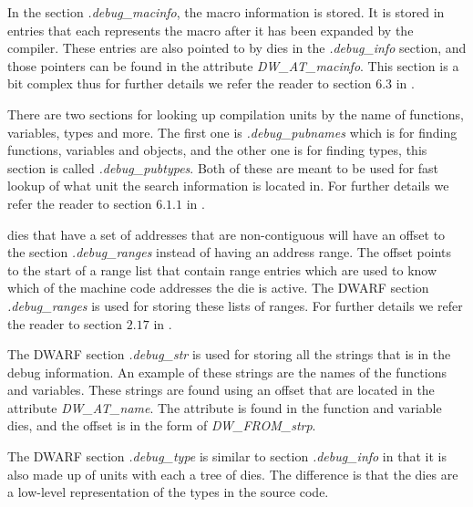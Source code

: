 In the section \emph{.debug\_macinfo}, the macro information is stored.
It is stored in entries that each represents the macro after it has been expanded by the compiler.
These entries are also pointed to by \glspl{die} in the \emph{.debug\_info} section, and those pointers can be found in the attribute \emph{DW\_AT\_macinfo}.
This section is a bit complex thus for further details we refer the reader to section $6.3$ in \cite{dwarf}.


There are two sections for looking up compilation units by the name of functions, variables, types and more.
The first one is \emph{.debug\_pubnames} which is for finding functions, variables and objects, and the other one is for finding types, this section is called \emph{.debug\_pubtypes}.
Both of these are meant to be used for fast lookup of what unit the search information is located in.
For further details we refer the reader to section $6.1.1$ in \cite{dwarf}.


\Glspl{die} that have a set of addresses that are non-contiguous will have an offset to the section \emph{.debug\_ranges} instead of having an address range.
The offset points to the start of a range list that contain range entries which are used to know which of the machine code addresses the \gls{die} is active.
The \gls{DWARF} section \emph{.debug\_ranges} is used for storing these lists of ranges.
For further details we refer the reader to section $2.17$ in \cite{dwarf}.


The \gls{DWARF} section \emph{.debug\_str} is used for storing all the strings that is in the debug information.
An example of these strings are the names of the functions and variables.
These strings are found using an offset that are located in the attribute \emph{DW\_AT\_name}.
The attribute is found in the function and variable \glspl{die}, and the offset is in the form of \emph{DW\_FROM\_strp}.


The \gls{DWARF} section \emph{.debug\_type} is similar to section \emph{.debug\_info} in that it is also made up of units with each a tree of \glspl{die}.
The difference is that the \glspl{die} are a low-level representation of the types in the source code.

